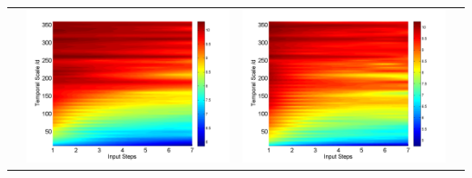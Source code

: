\documentclass[draft,wrr]{AGUTeX}
\begin{document}
\begin{article}
\begin{table}[H]
\begin{tabular}{cccc}
&\begin{minipage}{.3\textwidth}\includegraphics[width=\linewidth]{resultgraph/11532500p_abs.png}\end{minipage}
&\begin{minipage}{.3\textwidth}\includegraphics[width=\linewidth]{resultgraph/11532500pep_abs.png}\end{minipage}

\end{tabular}
\end{table}
\end{article}
\end{document}
